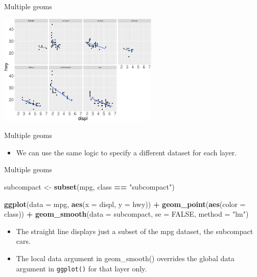 \documentclass[ignorenonframetext,]{beamer}
\newenvironment{Shaded}{\begin{snugshade}}{\end{snugshade}}
\newcommand{\DataTypeTok}[1]{\textcolor[rgb]{0.13,0.29,0.53}{#1}}
\newcommand{\KeywordTok}[1]{\textcolor[rgb]{0.13,0.29,0.53}{\textbf{#1}}}
\newcommand{\NormalTok}[1]{#1}
\newcommand{\OperatorTok}[1]{\textcolor[rgb]{0.81,0.36,0.00}{\textbf{#1}}}
\newcommand{\OtherTok}[1]{\textcolor[rgb]{0.56,0.35,0.01}{#1}}
\newcommand{\StringTok}[1]{\textcolor[rgb]{0.31,0.60,0.02}{#1}}
\providecommand{\tightlist}{%
  \setlength{\itemsep}{0pt}\setlength{\parskip}{0pt}}
\begin{document}
\begin{frame}{Multiple geoms}
\protect\hypertarget{multiple-geoms-25}{}

\begin{center}\includegraphics[height=200px]{data-visualization_files/figure-beamer/unnamed-chunk-103-1} \end{center}

\end{frame}

\begin{frame}{Multiple geoms}
\protect\hypertarget{multiple-geoms-26}{}

\begin{itemize}
\tightlist
\item
  We can use the same logic to specify a different dataset for each
  layer.
\end{itemize}

\end{frame}

\begin{frame}[fragile]{Multiple geoms}
\protect\hypertarget{multiple-geoms-27}{}

\begin{Shaded}
\begin{Highlighting}[]
\NormalTok{subcompact <-}\StringTok{ }\KeywordTok{subset}\NormalTok{(mpg, class }\OperatorTok{==}\StringTok{ "subcompact"}\NormalTok{)}

\KeywordTok{ggplot}\NormalTok{(}\DataTypeTok{data =}\NormalTok{ mpg, }\KeywordTok{aes}\NormalTok{(}\DataTypeTok{x =}\NormalTok{ displ, }\DataTypeTok{y =}\NormalTok{ hwy)) }\OperatorTok{+}
\StringTok{  }\KeywordTok{geom_point}\NormalTok{(}\KeywordTok{aes}\NormalTok{(}\DataTypeTok{color =}\NormalTok{ class)) }\OperatorTok{+}
\StringTok{  }\KeywordTok{geom_smooth}\NormalTok{(}\DataTypeTok{data =}\NormalTok{ subcompact, }\DataTypeTok{se =} \OtherTok{FALSE}\NormalTok{, }
              \DataTypeTok{method =} \StringTok{"lm"}\NormalTok{)}
\end{Highlighting}
\end{Shaded}

\begin{itemize}
\item
  The straight line displays just a subset of the mpg dataset, the
  subcompact cars.
\item
  The local data argument in geom\_smooth() overrides the global data
  argument in \texttt{ggplot()} for that layer only.
\end{itemize}

\end{frame}
\end{document}
